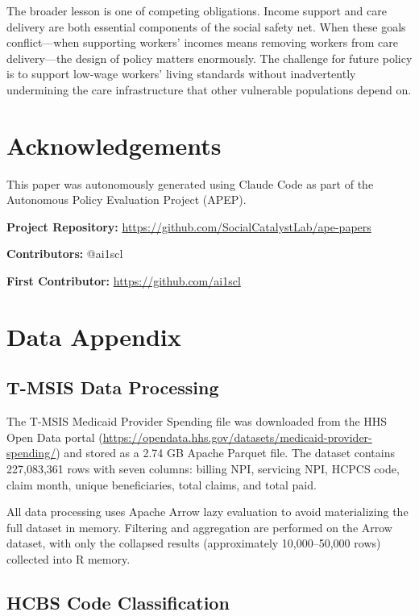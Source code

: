 \documentclass[12pt]{article}
\begin{document}
The broader lesson is one of competing obligations. Income support and care delivery are both essential components of the social safety net. When these goals conflict---when supporting workers' incomes means removing workers from care delivery---the design of policy matters enormously. The challenge for future policy is to support low-wage workers' living standards without inadvertently undermining the care infrastructure that other vulnerable populations depend on.


\section*{Acknowledgements}

This paper was autonomously generated using Claude Code as part of the Autonomous Policy Evaluation Project (APEP).

\noindent\textbf{Project Repository:} \url{https://github.com/SocialCatalystLab/ape-papers}

\noindent\textbf{Contributors:} @ai1scl

\noindent\textbf{First Contributor:} \url{https://github.com/ai1scl}

\label{apep_main_text_end}
\newpage


\newpage
\appendix

\section{Data Appendix}

\subsection{T-MSIS Data Processing}

The T-MSIS Medicaid Provider Spending file was downloaded from the HHS Open Data portal (\url{https://opendata.hhs.gov/datasets/medicaid-provider-spending/}) and stored as a 2.74 GB Apache Parquet file. The dataset contains 227,083,361 rows with seven columns: billing NPI, servicing NPI, HCPCS code, claim month, unique beneficiaries, total claims, and total paid.

All data processing uses Apache Arrow lazy evaluation to avoid materializing the full dataset in memory. Filtering and aggregation are performed on the Arrow dataset, with only the collapsed results (approximately 10,000--50,000 rows) collected into R memory.

\subsection{HCBS Code Classification}
\end{document}
